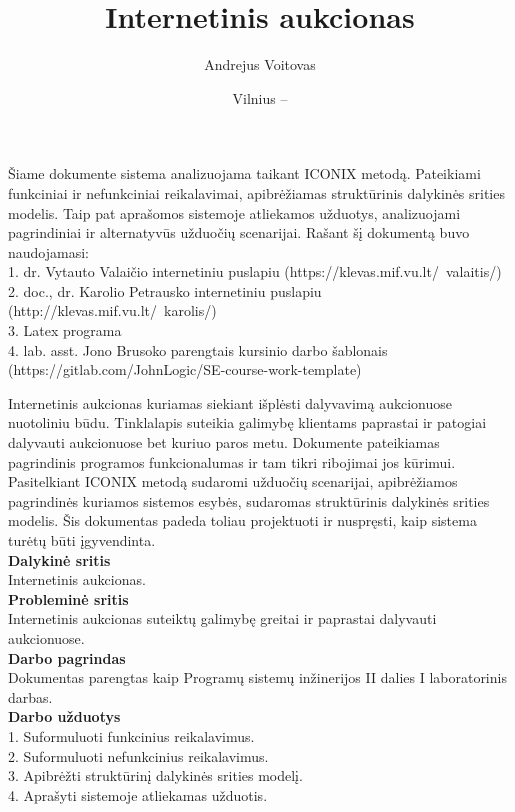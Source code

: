 \documentclass{VUMIFPSkursinis}
\title{Internetinis aukcionas}
\author{Andrejus Voitovas}
\date{Vilnius – \the\year}
\begin{document}
	\maketitle
	\cleardoublepage{}
	\setcounter{page}{2}
	Šiame dokumente sistema analizuojama taikant ICONIX metodą. Pateikiami funkciniai ir nefunkciniai reikalavimai, apibrėžiamas struktūrinis dalykinės srities modelis. Taip pat aprašomos sistemoje atliekamos užduotys, analizuojami pagrindiniai ir alternatyvūs užduočių scenarijai. Rašant šį dokumentą buvo naudojamasi:
	\\1. dr. Vytauto Valaičio internetiniu puslapiu (https://klevas.mif.vu.lt/~valaitis/)
	\\2. doc., dr. Karolio Petrausko internetiniu puslapiu (http://klevas.mif.vu.lt/~karolis/)
	\\3. Latex programa
	\\4. lab. asst. Jono Brusoko parengtais kursinio darbo šablonais (https://gitlab.com/JohnLogic/SE-course-work-template)
	\newpage
	\tableofcontents
	
	Internetinis aukcionas kuriamas siekiant išplėsti dalyvavimą aukcionuose nuotoliniu
	būdu. Tinklalapis suteikia galimybę klientams paprastai ir patogiai dalyvauti aukcionuose bet kuriuo paros metu. Dokumente pateikiamas pagrindinis programos funkcionalumas ir tam tikri ribojimai jos kūrimui. Pasitelkiant ICONIX metodą sudaromi užduočių scenarijai, apibrėžiamos pagrindinės kuriamos sistemos esybės, sudaromas struktūrinis dalykinės srities modelis. Šis dokumentas padeda toliau projektuoti ir nuspręsti, kaip sistema turėtų būti įgyvendinta.
	\\\textbf{Dalykinė sritis}
	\\Internetinis aukcionas.
	\\\textbf{Probleminė sritis} 
	\\Internetinis aukcionas suteiktų galimybę greitai ir paprastai dalyvauti aukcionuose.
	\\\textbf{Darbo pagrindas}
	\\Dokumentas parengtas kaip Programų sistemų inžinerijos II dalies I laboratorinis darbas.
	\\\textbf{Darbo užduotys}
	\\1. Suformuluoti funkcinius reikalavimus.
	\\2. Suformuluoti nefunkcinius reikalavimus.
	\\3. Apibrėžti struktūrinį dalykinės srities modelį.
	\\4. Aprašyti sistemoje atliekamas užduotis.
	\newpage
\end{document}

